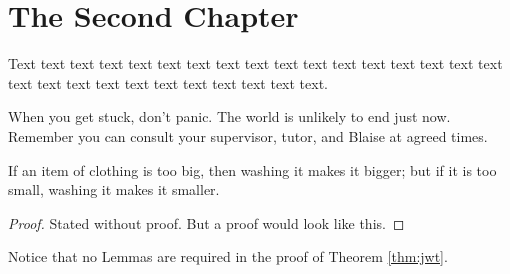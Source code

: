 \chapter{The Second Chapter}

Text text text text text text text text text text text text text text
text text text text text text text text text text text text text text.

When you get stuck, don't panic. 
The world is unlikely to end just now. 
Remember you can consult your supervisor, tutor, and Blaise at agreed times. 

\begin{thm}
\label{thm:jwt}
If an item of clothing is too big, then washing it makes it bigger;
but if it is too small, washing it makes it smaller.
\end{thm}
\begin{proof}
Stated without proof. But a proof would look like this. 
\end{proof}

Notice that no Lemmas are required in the proof of Theorem \ref{thm:jwt}.
